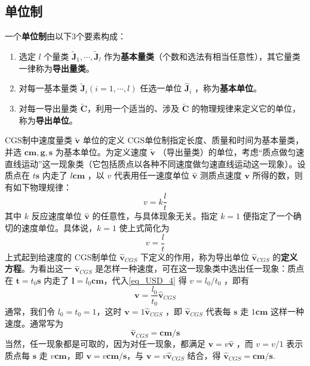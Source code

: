 \subsection{单位制}
一个\textbf{单位制}由以下3个要素构成：
\begin{enumerate}
\item 选定 $l$ 个量类 $\tilde{\boldsymbol{J}}_1,\cdots,\tilde{\boldsymbol{J}}_l$ 作为\textbf{基本量类}（个数和选法有相当任意性），其它量类一律称为\textbf{导出量类}。  
\item 对每一基本量类 $\tilde{\boldsymbol{J}}_i(i=1,\cdots,l)$ 任选一单位 $\hat{\boldsymbol{J}}_i$ ，称为\textbf{基本单位}。
\item 对每一导出量类 $\tilde{\boldsymbol{C}}$，利用一个适当的、涉及 $\tilde{\boldsymbol{C}}$ 的物理规律来定义它的单位，称为\textbf{导出单位}。
\end{enumerate}
\begin{example}{CGS制中速度量类 $\tilde{\boldsymbol{v}
}$ 单位的定义}\label{ex_USD_1}
CGS单位制指定长度、质量和时间为基本量类，并选 $\boldsymbol{cm},\boldsymbol{g},\boldsymbol{s}$ 为基本单位。为定义速度 $\tilde{\boldsymbol{v}}$ （导出量类）的单位，考虑“质点做匀速直线运动”这一现象类（它包括质点以各种不同速度做匀速直线运动这一现象）。设质点在 $t\boldsymbol{s}$ 内走了 $l\boldsymbol{cm}$ ，以 $v$ 代表用任一速度单位 $\hat{\boldsymbol{v}}$ 测质点速度 $\boldsymbol{v}$ 所得的数，则有如下物理规律：
\begin{equation}
v=k\frac{l}{t}
\end{equation}
其中 $k$ 反应速度单位 $\hat{\boldsymbol{v}}$ 的任意性，与具体现象无关。指定 $k=1$ 便指定了一个确切的速度单位。具体说，$k=1$ 使上式简化为
\begin{equation}\label{eq_USD_4}
v=\frac{l}{t}
\end{equation}
上式起到给速度的 CGS制单位 $\hat{\boldsymbol{v}}_{CGS}$ 下定义的作用，称为导出单位 $\hat{\boldsymbol{v}}_{CGS}$ 的\textbf{定义方程}。为看出这一 $\hat{\boldsymbol{v}}_{CGS}$ 是怎样一种速度，可在这一现象类中选出任一现象：质点在 $\boldsymbol{t}=t_0\boldsymbol{s}$ 内走了 $\boldsymbol{l}=l_0\boldsymbol{cm}$，代入\autoref{eq_USD_4} 得 $v=l_0/t_0$ ，即有
\begin{equation}
\boldsymbol{v}=\frac{l_0}{t_0}\hat{\boldsymbol{v}}_{CGS}
\end{equation}
通常，我们令 $l_0=t_0=1$，这时 $\boldsymbol{v}=1\hat{\boldsymbol{v}}_{CGS}$ ，即 $\hat{\boldsymbol{v}}_{CGS}$ 代表每 $\boldsymbol{s}$ 走 $1\boldsymbol{cm}$ 这样一种速度。通常写为
\begin{equation}
\hat{\boldsymbol{v}}_{CGS}=\boldsymbol{cm/s}
\end{equation}
当然，任一现象都是可取的，因为对任一现象，都满足 $\boldsymbol{v}=v\hat{\boldsymbol{v}}$ ，而 $v=v/1$ 表示质点每 $\boldsymbol{s}$ 走 $v\boldsymbol{cm}$，即 $\boldsymbol{v}=v\boldsymbol{cm/s}$，与 $\boldsymbol{v}=v\hat{\boldsymbol{v}}_{CGS}$ 结合，得 $\hat{\boldsymbol{v}}_{CGS}=\boldsymbol{cm/s}$.

\end{example}
